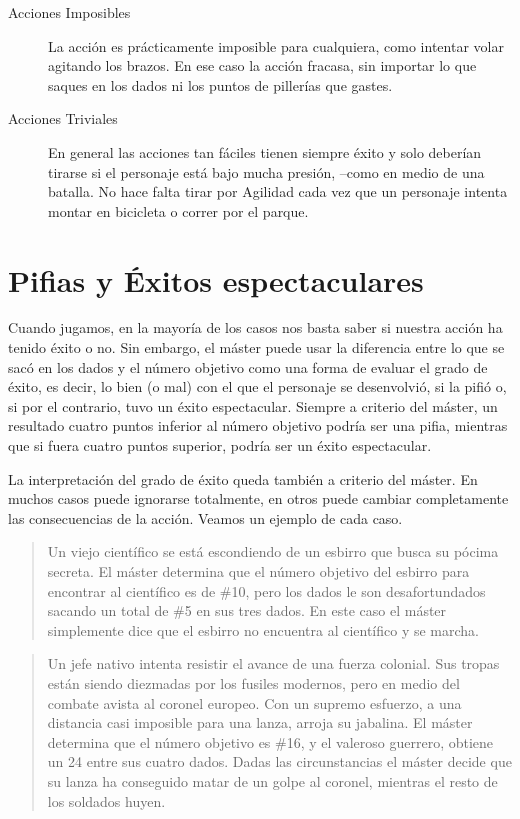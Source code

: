 \begin{description}
\item[Acciones Imposibles] La acción es prácticamente imposible para cualquiera, como intentar volar agitando los brazos. En ese caso la acción fracasa, sin importar lo que saques en los dados ni los puntos de pillerías que gastes.
\item[Acciones Triviales] En general las acciones tan fáciles tienen siempre éxito y solo deberían tirarse si el personaje está bajo mucha presión, --como en medio de una batalla. No hace falta tirar por Agilidad cada vez que un personaje intenta montar en bicicleta o correr por el parque.
\end{description}

\section{Pifias y Éxitos espectaculares}

Cuando jugamos, en la mayoría de los casos nos basta saber si nuestra acción ha tenido éxito o no. Sin embargo, el máster puede usar la diferencia entre lo que se sacó en los dados y el número objetivo como una forma de evaluar el grado de éxito, es decir, lo bien (o mal) con el que el personaje se desenvolvió, si la pifió o, si por el contrario, tuvo un éxito espectacular. Siempre a criterio del máster, un resultado cuatro puntos inferior al número objetivo podría ser una pifia, mientras que si fuera cuatro puntos superior, podría ser un éxito espectacular.

La interpretación del grado de éxito queda también a criterio del máster. En muchos casos puede ignorarse totalmente, en otros puede cambiar completamente las consecuencias de la acción. Veamos un ejemplo de cada caso.

\begin{quotation}
Un viejo científico se está escondiendo de un esbirro que busca su pócima secreta. El máster determina que el número objetivo del esbirro para encontrar al científico es de \#10, pero los dados le son desafortundados sacando un total de \#5 en sus tres dados. En este caso el máster simplemente dice que el esbirro no encuentra al científico y se marcha.
\end{quotation}
\begin{quotation}
Un jefe nativo intenta resistir el avance de una fuerza colonial. Sus tropas están siendo diezmadas por los fusiles modernos, pero en medio del combate avista al coronel europeo. Con un supremo esfuerzo, a una distancia casi imposible para una lanza, arroja su jabalina. El máster determina que el número objetivo es \#16, y el valeroso guerrero, obtiene un 24 entre sus cuatro dados. Dadas las circunstancias el máster decide que su lanza ha conseguido matar de un golpe al coronel, mientras el resto de los soldados huyen.
\end{quotation}

